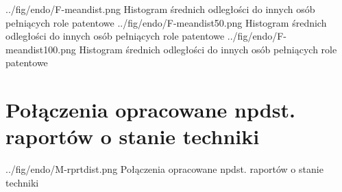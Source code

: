 \figsidesTri
  {../fig/endo/F-meandist.png}
    {Histogram średnich odległości do innych osób pełniących role patentowe}
  {../fig/endo/F-meandist50.png}
    {Histogram średnich odległości do innych osób pełniących role patentowe}
  {../fig/endo/F-meandist100.png}
    {Histogram średnich odległości do innych osób pełniących role patentowe}



\newpage

\section{Połączenia opracowane npdst. raportów o stanie techniki}

  {../fig/endo/M-rprtdist.png}
    {Połączenia opracowane npdst. raportów o stanie techniki}


